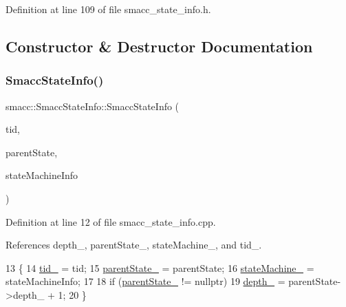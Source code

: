 Definition at line 109 of file smacc\+\_\+state\+\_\+info.\+h.



\subsection{Constructor \& Destructor Documentation}
\mbox{\label{classsmacc_1_1introspection_1_1SmaccStateInfo_a262bc6242d8a3b2c29c34b4cf325dfb4}} 
\subsubsection{\texorpdfstring{Smacc\+State\+Info()}{SmaccStateInfo()}}
{\footnotesize\ttfamily smacc\+::\+Smacc\+State\+Info\+::\+Smacc\+State\+Info (\begin{DoxyParamCaption}\item[{const std\+::type\+\_\+info $\ast$}]{tid,  }\item[{std\+::shared\+\_\+ptr$<$ \hyperlink{classsmacc_1_1introspection_1_1SmaccStateInfo}{Smacc\+State\+Info} $>$}]{parent\+State,  }\item[{std\+::shared\+\_\+ptr$<$ \hyperlink{classsmacc_1_1introspection_1_1SmaccStateMachineInfo}{Smacc\+State\+Machine\+Info} $>$}]{state\+Machine\+Info }\end{DoxyParamCaption})}



Definition at line 12 of file smacc\+\_\+state\+\_\+info.\+cpp.



References depth\+\_\+, parent\+State\+\_\+, state\+Machine\+\_\+, and tid\+\_\+.


\begin{DoxyCode}
13 \{
14     \hyperlink{classsmacc_1_1introspection_1_1SmaccStateInfo_a37d0d0bce171b57b8d3a39f44ab45248}{tid\_} = tid;
15     \hyperlink{classsmacc_1_1introspection_1_1SmaccStateInfo_afa49a141d2ccdb3d6f9676ed380ce006}{parentState\_} = parentState;
16     \hyperlink{classsmacc_1_1introspection_1_1SmaccStateInfo_a74685e4540842ee292a80a1db44818bb}{stateMachine\_} = stateMachineInfo;
17 
18     \textcolor{keywordflow}{if} (\hyperlink{classsmacc_1_1introspection_1_1SmaccStateInfo_afa49a141d2ccdb3d6f9676ed380ce006}{parentState\_} != \textcolor{keyword}{nullptr})
19         \hyperlink{classsmacc_1_1introspection_1_1SmaccStateInfo_a7e97a482ca49057f27e638268d1a3189}{depth\_} = parentState->depth\_ + 1;
20 \}
\end{DoxyCode}


